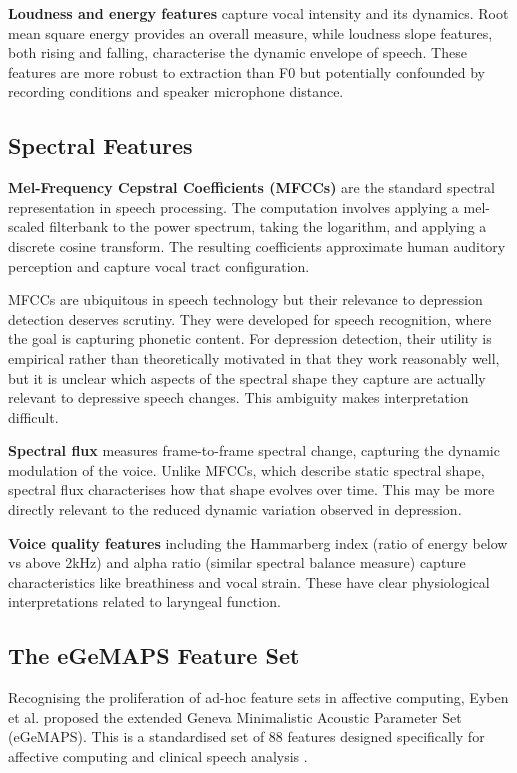 \textbf{Loudness and energy features} capture vocal intensity and its dynamics. Root mean square energy provides an overall measure, while loudness slope features, both rising and falling, characterise the dynamic envelope of speech. These features are more robust to extraction than F0 but potentially confounded by recording conditions and speaker microphone distance.

\subsection{Spectral Features}

\textbf{Mel-Frequency Cepstral Coefficients (MFCCs)} are the standard spectral representation in speech processing. The computation involves applying a mel-scaled filterbank to the power spectrum, taking the logarithm, and applying a discrete cosine transform. The resulting coefficients approximate human auditory perception and capture vocal tract configuration.

MFCCs are ubiquitous in speech technology but their relevance to depression detection deserves scrutiny. They were developed for speech recognition, where the goal is capturing phonetic content. For depression detection, their utility is empirical rather than theoretically motivated in that they work reasonably well, but it is unclear which aspects of the spectral shape they capture are actually relevant to depressive speech changes. This ambiguity makes interpretation difficult.

\textbf{Spectral flux} measures frame-to-frame spectral change, capturing the dynamic modulation of the voice. Unlike MFCCs, which describe static spectral shape, spectral flux characterises how that shape evolves over time. This may be more directly relevant to the reduced dynamic variation observed in depression.

\textbf{Voice quality features} including the Hammarberg index (ratio of energy below vs above 2kHz) and alpha ratio (similar spectral balance measure) capture characteristics like breathiness and vocal strain. These have clear physiological interpretations related to laryngeal function.

\subsection{The eGeMAPS Feature Set}

Recognising the proliferation of ad-hoc feature sets in affective computing, Eyben et al. proposed the extended Geneva Minimalistic Acoustic Parameter Set (eGeMAPS). This is a standardised set of 88 features designed specifically for affective computing and clinical speech analysis \cite{Eyben2016}.

